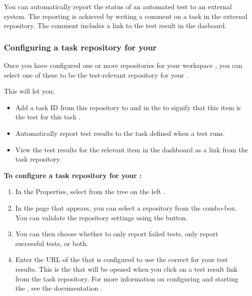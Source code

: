 You can automatically report the status of an automated test to an external system. The reporting is achieved by writing a comment on a task in the external repository. The comment includes a link to the test result in the dasboard. 

\subsubsection{Configuring a task repository for your \gdproject{}}
\label{TasksALMConfigureProject}
Once you have configured one or more repositories for your workspace , you can select one of these to be the test-relevant repository for your \gdproject{}. 

This will let you:
\begin{itemize}
\item Add a task ID from this repository to \gdcases{} and \gdsuites{} in the \gdproject{} to signify that this item is the test for this task .
\item Automatically report test results to the task defined when a test runs.
\item View the test results for the relevant item in the dashboard as a link from the task repository.
\end{itemize}

\textbf{To configure a task repository for your \gdproject{}:}

\begin{enumerate}
\item In the \gdproject{} Properties, select  from the tree on the left .
\item In the page that appears, you can select a repository from the combo-box. You can validate the repository settings using the button.
\item You can then choose whether to only report failed tests, only report successful tests, or both.
\item Enter the URL of the \dash{} that is configured to use the correct \gddb{} for your test results. This is the \dash{} that will be opened when you click on a test result link from the task repository. For more information on configuring and starting the \dash{}, see the documentation .
\end{enumerate}

